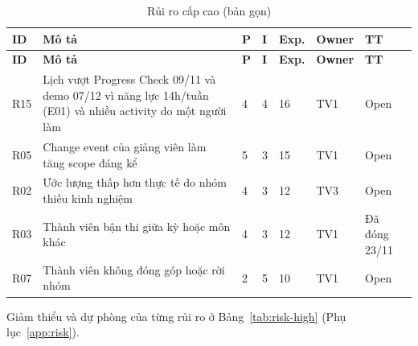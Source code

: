 \begingroup\tblsetup\tblzebra
\begin{longtable}{L{0.9cm}L{6.9cm}L{0.6cm}L{0.6cm}L{1.0cm}L{1.4cm}L{2.6cm}}
\caption{Rủi ro cấp cao (bản gọn)}\label{tab:risk-high-ct}\\
\toprule
{}\textbf{ID} & \textbf{Mô tả} & \textbf{P} & \textbf{I} & \textbf{Exp.} & \textbf{Owner} & \textbf{TT} \\
\midrule
\endfirsthead
\toprule
{}\textbf{ID} & \textbf{Mô tả} & \textbf{P} & \textbf{I} & \textbf{Exp.} & \textbf{Owner} & \textbf{TT} \\
\midrule
\endhead
\bottomrule
\endlastfoot
R15 & Lịch vượt Progress Check 09/11 và demo 07/12 vì năng lực 14h/tuần (E01) và nhiều activity do một người làm & 4 & 4 & 16 & TV1 & Open \\
R05 & Change event của giảng viên làm tăng scope đáng kể & 5 & 3 & 15 & TV1 & Open \\
R02 & Ước lượng thấp hơn thực tế do nhóm thiếu kinh nghiệm & 4 & 3 & 12 & TV3 & Open \\
R03 & Thành viên bận thi giữa kỳ hoặc môn khác & 4 & 3 & 12 & TV1 & Đã đóng 23/11 \\
R07 & Thành viên không đóng góp hoặc rời nhóm & 2 & 5 & 10 & TV1 & Open \\
\end{longtable}
\endgroup

Giảm thiểu và dự phòng của từng rủi ro ở Bảng~\ref{tab:risk-high} (Phụ lục~\ref{app:risk}).
